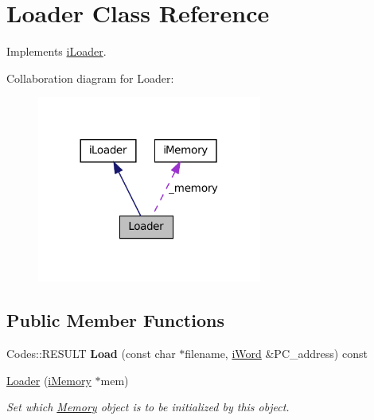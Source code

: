\hypertarget{classLoader}{
\section{Loader Class Reference}
\label{classLoader}
}


Implements \hyperlink{classiLoader}{iLoader}.  




Collaboration diagram for Loader:\nopagebreak
\begin{figure}[H]
\begin{center}
\leavevmode
\includegraphics[width=209pt]{classLoader__coll__graph}
\end{center}
\end{figure}
\subsection*{Public Member Functions}
\begin{DoxyCompactItemize}
\item 
\hypertarget{classLoader_acc964f5d36a91baa584a8ecfa1e3945f}{
Codes::RESULT {\bfseries Load} (const char $\ast$filename, \hyperlink{classiWord}{iWord} \&PC\_\-address) const }
\label{classLoader_acc964f5d36a91baa584a8ecfa1e3945f}

\item 
\hyperlink{classLoader_ab2155ac99a41ba255c88161b9a3d218a}{Loader} (\hyperlink{classiMemory}{iMemory} $\ast$mem)
\begin{DoxyCompactList}\small\item\em Set which \hyperlink{classMemory}{Memory} object is to be initialized by this object. \item\end{DoxyCompactList}\end{DoxyCompactItemize}
